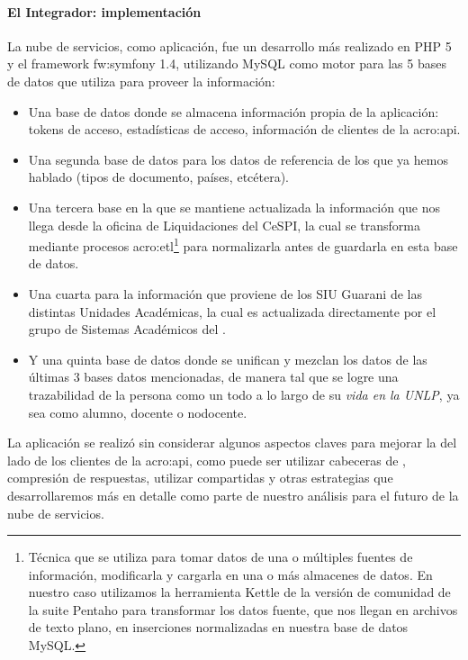 \paragraph{El Integrador: implementación}

La nube de servicios, como aplicación, fue un desarrollo más realizado en PHP 5 y el framework \gls{fw:symfony} 1.4, utilizando MySQL como motor para las 5 bases de datos que utiliza para proveer la información:

\begin{itemize}
  \item Una base de datos donde se almacena información propia de la aplicación: tokens de acceso, estadísticas de acceso, información de clientes de la \gls{acro:api}.
  \item Una segunda base de datos para los datos de referencia de los que ya hemos hablado (tipos de documento, países, etcétera).
  \item Una tercera base en la que se mantiene actualizada la información que nos llega desde la oficina de Liquidaciones del CeSPI, la cual se transforma mediante procesos \gls{acro:etl}\footnote{Técnica que se utiliza para tomar datos de una o múltiples fuentes de información, modificarla y cargarla en una o más almacenes de datos. En nuestro caso utilizamos la herramienta Kettle de la versión de comunidad de la suite Pentaho para transformar los datos fuente, que nos llegan en archivos de texto plano, en inserciones normalizadas en nuestra base de datos MySQL.}\cite{paper:etl} para normalizarla antes de guardarla en esta base de datos.
  \item Una cuarta para la información que proviene de los SIU Guarani de las distintas Unidades Académicas, la cual es actualizada directamente por el grupo de Sistemas Académicos del \cespi.
  \item Y una quinta base de datos donde se unifican y mezclan los datos de las últimas 3 bases datos mencionadas, de manera tal que se logre una trazabilidad de la persona como un todo a lo largo de su \textit{vida en la UNLP}, ya sea como alumno, docente o nodocente.
\end{itemize}

La aplicación se realizó sin considerar algunos aspectos claves para mejorar la  del lado de los clientes de la \gls{acro:api}, como puede ser utilizar cabeceras de , compresión de respuestas, utilizar  compartidas y otras estrategias que desarrollaremos más en detalle como parte de nuestro análisis para el futuro de la nube de servicios.

